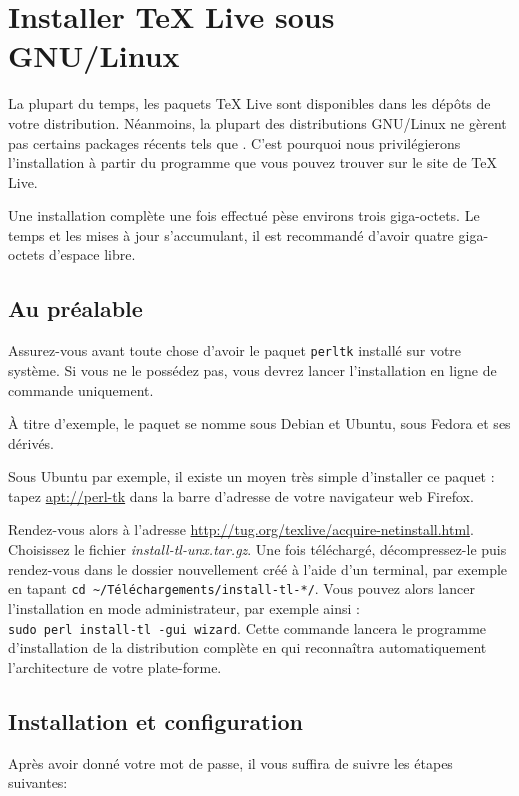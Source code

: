 \section{Installer TeX Live sous GNU/Linux}

La plupart du temps, les paquets TeX Live sont disponibles dans les dépôts de votre distribution. Néanmoins, la plupart des distributions GNU/Linux ne gèrent pas certains packages récents tels que . C'est pourquoi nous privilégierons l'installation à partir du programme que vous pouvez trouver sur le site de TeX Live.

Une installation complète une fois effectué pèse environs trois giga-octets. Le temps et les mises à jour s'accumulant, il est recommandé d'avoir quatre giga-octets d'espace libre.

\subsection{Au préalable}

Assurez-vous avant toute chose d'avoir le paquet \verb|perltk| installé sur votre système. Si vous ne le possédez pas, vous devrez lancer l'installation en ligne de commande uniquement.

À titre d'exemple, le paquet se nomme  sous Debian et Ubuntu,  sous Fedora et ses dérivés.

Sous Ubuntu par exemple, il existe un moyen très simple d'installer ce paquet : tapez \url{apt://perl-tk} dans la barre d'adresse de votre navigateur web Firefox.

Rendez-vous alors à l'adresse \url{http://tug.org/texlive/acquire-netinstall.html}. Choisissez  le fichier \emph{install-tl-unx.tar.gz}. Une fois téléchargé, décompressez-le puis rendez-vous dans le dossier nouvellement créé à l'aide d'un terminal, par exemple en tapant \verb|cd ~/Téléchargements/install-tl-*/|. Vous pouvez alors lancer l'installation en mode administrateur, par exemple ainsi :\\
\verb|sudo perl install-tl -gui wizard|. Cette commande lancera le programme d'installation de la distribution complète en qui reconnaîtra automatiquement l'architecture de votre plate-forme.

\subsection{Installation et configuration}

Après avoir donné votre mot de passe, il vous suffira de suivre les étapes suivantes:

